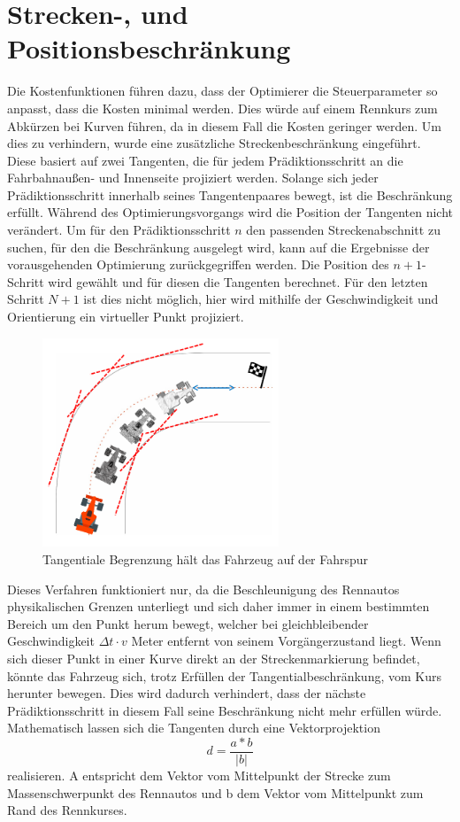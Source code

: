 \documentclass{like}
\begin{document}
\section{Strecken-, und Positionsbeschränkung}
\label{trackAndPosConstraint}
Die Kostenfunktionen führen dazu, dass der Optimierer die Steuerparameter so anpasst, dass die Kosten minimal werden. Dies würde auf einem Rennkurs zum Abkürzen bei Kurven führen, da in diesem Fall die Kosten geringer werden. Um dies zu verhindern, wurde eine zusätzliche Streckenbeschränkung eingeführt. Diese basiert auf zwei Tangenten, die für jedem Prädiktionsschritt an die Fahrbahnaußen- und Innenseite projiziert werden. Solange sich jeder Prädiktionsschritt innerhalb seines Tangentenpaares bewegt, ist die Beschränkung erfüllt. Während des Optimierungsvorgangs wird die Position der Tangenten nicht verändert. Um für den Prädiktionsschritt \(n\) den passenden Streckenabschnitt zu suchen, für den die Beschränkung ausgelegt wird, kann auf die Ergebnisse der vorausgehenden Optimierung zurückgegriffen werden. Die Position des $n+1$-Schritt wird gewählt und für diesen die Tangenten berechnet. Für den letzten Schritt \(N +1\) ist dies nicht möglich, hier wird mithilfe der Geschwindigkeit und Orientierung ein virtueller Punkt projiziert.   

\begin{figure}[ht!]
	\centering
	\includegraphics[width=200pt]{Abbildungen/tangentialConstraint.png}
	\caption{Tangentiale Begrenzung hält das Fahrzeug auf der Fahrspur}
	\label{fig:costGoalDist}
\end{figure}
Dieses Verfahren funktioniert nur, da die Beschleunigung des Rennautos physikalischen Grenzen unterliegt und sich daher immer in einem bestimmten Bereich um den Punkt herum bewegt, welcher bei gleichbleibender Geschwindigkeit $\Delta t \cdot v$ Meter entfernt von seinem Vorgängerzustand liegt. Wenn sich dieser Punkt in einer Kurve direkt an der Streckenmarkierung befindet, könnte das Fahrzeug sich, trotz Erfüllen der Tangentialbeschränkung, vom Kurs herunter bewegen. Dies wird dadurch verhindert, dass der nächste Prädiktionsschritt in diesem Fall seine Beschränkung nicht mehr erfüllen würde.
Mathematisch lassen sich die Tangenten durch eine Vektorprojektion 
\begin{equation}
	d = \frac{a*b}{|b|}
\end{equation}
realisieren. A entspricht dem Vektor vom Mittelpunkt der Strecke zum Massenschwerpunkt des Rennautos und b dem Vektor vom Mittelpunkt zum Rand des Rennkurses. 
\end{document}
